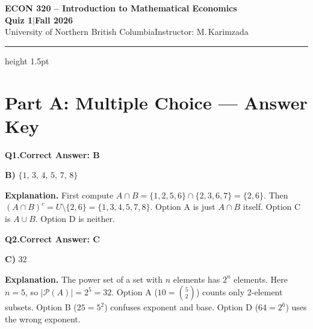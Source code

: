 \documentclass[11pt]{article}
\begin{document}



\vspace{0.5em}

\begin{center}
{\LARGE\bfseries\color{UNBCDark}ECON 320 \;--\; Introduction to Mathematical Economics}\\[0.5em]
{\large\bfseries Quiz 1\quad\textcolor{UNBCGold}{$|$}\quad Fall 2026}\\[0.2em]
{\small University of Northern British Columbia\quad Instructor: M.\,Karimzada}
\end{center}

\vspace{0.3em}
{\color{UNBCGold}\hrule height 1.5pt}
\vspace{0.5em}



\vspace{0.6em}

\section{Part A: Multiple Choice --- Answer Key}



\bigskip

\noindent\textbf{Q1.}\quad\textbf{Correct Answer: B}

\begin{correctbox}
\textbf{B)}\; $\{1,\,3,\,4,\,5,\,7,\,8\}$
\end{correctbox}

\medskip
\noindent\textbf{Explanation.}\enspace
First compute $A \cap B = \{1,2,5,6\} \cap \{2,3,6,7\} = \{2,6\}$.
Then $(A \cap B)^c = U \setminus \{2,6\} = \{1,3,4,5,7,8\}$.
Option A is just $A \cap B$ itself. Option C is $A \cup B$. Option D is neither.

\bigskip

\noindent\textbf{Q2.}\quad\textbf{Correct Answer: C}

\begin{correctbox}
\textbf{C)}\; $32$
\end{correctbox}

\medskip
\noindent\textbf{Explanation.}\enspace
The power set of a set with $n$ elements has $2^n$ elements.
Here $n = 5$, so $|\mathcal{P}(A)| = 2^5 = 32$.
Option A ($10 = \binom{5}{2}$) counts only 2-element subsets.
Option B ($25 = 5^2$) confuses exponent and base.
Option D ($64 = 2^6$) uses the wrong exponent.
\end{document}
